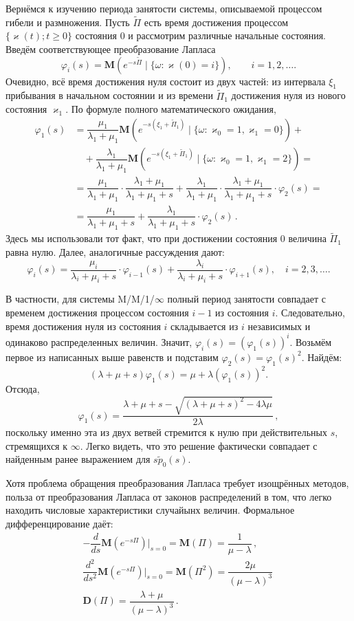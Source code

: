 \documentclass[10pt,oneside,final]{book}
\newcommand{\M}{{\mathbf M}}
\newcommand{\D}{{\mathbf D}}
\begin{document}
Вернёмся к изучению периода занятости системы, описываемой процессом гибели и
размножения. Пусть $\tilde\Pi$ есть время достижения процессом $\{\varkappa(t);
t\geqslant0\}$ состояния $0$ и рассмотрим различные начальные состояния. Введём
соответствующее преобразование Лапласа
\[
\varphi_i(s)=\M(e^{-s\tilde\Pi}\mid\{\omega\colon \varkappa(0)=i\}), \qquad i=1,
2, \ldots.
\]
Очевидно, всё время достижения нуля состоит из двух частей: из интервала $\xi_1$
прибывания в начальном состоянии и из времени $\tilde\Pi_1$ достижения нуля из нового
состояния $\varkappa_1$. По формуле полного математического ожидания,
\begin{align*}
  \varphi_1(s)&= \dfrac{\mu_1}{\lambda_1+\mu_1}
  \M(e^{-s(\xi_1+\tilde\Pi_1)}\mid\{\omega\colon \varkappa_0=1, \varkappa_1=0\})
  +
  \\ & \quad 
  +\dfrac{\lambda_1}{\lambda_1+\mu_1}
  \M(e^{-s(\xi_1+\tilde\Pi_1)}\mid\{\omega\colon \varkappa_0=1,
  \varkappa_1=2\})=
  \\ & =
  \dfrac{\mu_1}{\lambda_1+\mu_1}\cdot
  \dfrac{\lambda_1+\mu_1}{\lambda_1+\mu_1+s}+
  \dfrac{\lambda_1}{\lambda_1+\mu_1}\cdot
  \dfrac{\lambda_1+\mu_1}{\lambda_1+\mu_1+s} \cdot \varphi_2(s)=
  \\ & =
  \dfrac{\mu_1}{\lambda_1+\mu_1+s}+
  \dfrac{\lambda_1}{\lambda_1+\mu_1+s} \cdot \varphi_2(s)\,. 
\end{align*}
Здесь мы использовали тот факт, что при достижении состояния $0$ величина
$\tilde\Pi_1$ равна нулю. Далее, аналогичные рассуждения дают:
\[
\varphi_i(s)=\dfrac{\mu_i}{\lambda_i+\mu_i+s} \cdot \varphi_{i-1}(s)+
\dfrac{\lambda_i}{\lambda_i+\mu_i+s} \cdot \varphi_{i+1}(s),\quad i=2, 3, \ldots{}.
\]

В частности, для системы M/M/1/$\infty$ полный период занятости совпадает с
временем достижения процессом состояния $i-1$ из состояния $i$. Следовательно,
время достижения нуля из состояния $i$ складывается из $i$ независимых и
одинаково распределенных величин. Значит,
$\varphi_i(s)=(\varphi_1(s))^i$. Возьмём первое из написанных выше равенств и
подставим $\varphi_2(s)=\varphi_1(s)^2$. Найдём:
\[
(\lambda+\mu+s)\varphi_1(s)= \mu + \lambda (\varphi_1(s))^2.
\]
Отсюда,
\[
\varphi_1(s)=\dfrac{\lambda+\mu+s-\sqrt{(\lambda+\mu+s)^2-4\lambda\mu}}{2\lambda}\,,
\]
поскольку именно эта из двух ветвей стремится к нулю при действительных $s$,
стремящихся к $\infty$. Легко видеть, что это решение фактически совпадает с
найденным ранее выражением для $s\tilde p_0(s)$. 

Хотя проблема обращения преобразования Лапласа требует изощрённых методов,
польза от преобразования Лапласа от законов распределений в том, что легко
находить числовые характеристики случайынх величин. Формальное дифференцирование
даёт:
\begin{gather*}
  -\dfrac{d}{ds}\M(e^{-s\Pi})
  \Big|_{s=0}=\M(\Pi)=\dfrac{1}{\mu-\lambda}\,,\\
  \dfrac{d^2}{ds^2}\M(e^{-s\Pi})
  \Big|_{s=0}=\M(\Pi^2)=\dfrac{2\mu}{(\mu-\lambda)^3}\,\\
  \D(\Pi)=\dfrac{\lambda+\mu}{(\mu-\lambda)^3}\,.
\end{gather*}
\end{document}

